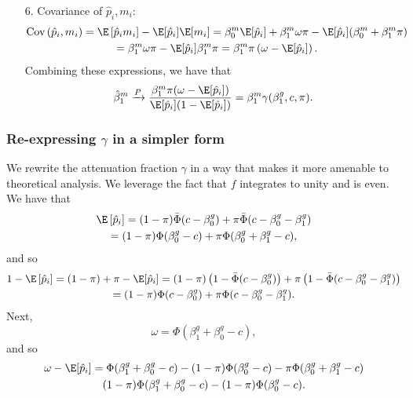 \documentclass[12pt]{article}
\begin{document}
\begin{itemize}
\item[6.] Covariance of $\hat{p}_i, m_i$:
\begin{multline*}
\textrm{Cov}\left(\hat{p}_i, m_i\right) = \E\left[\hat{p}_i m_i\right] - \E[\hat{p}_i] \E[m_i] = \beta^m_0 \E[\hat{p}_i] + \beta^m_1 \omega \pi - \E[\hat{p}_i]( \beta^m_0 + \beta^m_1 \pi)\\ = \beta^m_1 \omega \pi - \E[\hat{p}_i] \beta_1^m \pi = \beta^m_1 \pi \left( \omega - \E[\hat{p}_i]\right).
\end{multline*}
Combining these expressions, we have that
$$ \hat{\beta}^m_1 \xrightarrow{P} \frac{\beta^m_1 \pi (\omega - \E[\hat{p}_i])}{\E[\hat{p}_i](1 - \E[\hat{p}_i])} = \beta^m_1 \gamma(\beta^g_1, c, \pi).$$
\end{itemize}

\subsubsection{Re-expressing $\gamma$ in a simpler form}\label{sec:simplication}
We rewrite the attenuation fraction $\gamma$ in a way that makes it more amenable to theoretical analysis. We leverage the fact that $f$ integrates to unity and is even. We have that
\begin{multline}\label{thm:gamma_expression_1} \E\left[\hat{p}_i\right] = (1 - \pi) \bar{\Phi}(c - \beta_0^g) + \pi \bar{\Phi}(c - \beta^g_0 - \beta^g_1) \\ = (1 - \pi) \Phi(\beta_0^g - c) + \pi\Phi(\beta^g_0 + \beta^g_1 - c), \end{multline}
 and so \begin{multline}\label{thm:gamma_expression_2} 1 - \E\left[\hat{p}_i\right] = (1 - \pi) + \pi - \E[\hat{p}_i]  = (1-\pi) \left(1 - \bar{\Phi}(c - \beta_0^g)\right)  + \pi \left(1 - \bar{\Phi}(c - \beta^g_0 - \beta^g_1) \right) \\ = (1 - \pi)\Phi(c - \beta^g_0) + \pi \Phi(c - \beta_0^g - \beta_1^g).
\end{multline}
Next,
\begin{equation}\label{thm:gamma_expression_3}
\omega = \Phi(\beta^g_1 + \beta^g_0 - c),\end{equation} and so
\begin{multline}\label{thm:gamma_expression_4}
\omega - \E[\hat{p}_i] = \Phi(\beta^g_1 + \beta^g_0 - c) - (1-\pi)\Phi(\beta^g_0 - c) - \pi \Phi(\beta^g_0 + \beta^g_1 - c)  \\ (1-\pi)\Phi(\beta^g_1 + \beta^g_0 - c)  - (1-\pi)\Phi(\beta^g_0 - c).
\end{multline}
\end{document}
